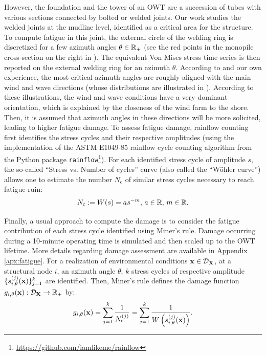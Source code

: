 However, the foundation and the tower of an OWT are a succession of tubes with various sections connected by bolted or welded joints. 
Our work studies the welded joints at the mudline level, identified as a critical area for the structure. 
To compute fatigue in this joint, the external circle of the welding ring is discretized for a few azimuth angles $\theta \in \mathbb{R}_+$ (see the red points in the monopile cross-section on the right in ). 
The equivalent Von Mises stress time series is then reported on the external welding ring for an azimuth $\theta$. 
According to \cite{li_zhan_2020} and our own experience, the most critical azimuth angles are roughly aligned with the main wind and wave directions (whose distributions are illustrated in ). 
According to these illustrations, the wind and wave conditions have a very dominant orientation, which is explained by the closeness of the wind farm to the shore. 
Then, it is assumed that azimuth angles in these directions will be more solicited, leading to higher fatigue damage. 
To assess fatigue damage, rainflow counting \citep{dowling_1972} first identifies the stress cycles and their respective amplitudes (using the implementation of the ASTM E1049-85 rainflow cycle counting algorithm from the Python package \texttt{rainflow}\footnote{\url{https://github.com/iamlikeme/rainflow}}). 
For each identified stress cycle of amplitude $s$, the so-called ``Stress vs. Number of cycles'' curve (also called the ``W\"ohler curve'') allows one to estimate the number $N_{\mathrm{c}}$ of similar stress cycles necessary to reach fatigue ruin:
\begin{equation}
    N_{\mathrm{c}} := W(s) = a s^{-m}, \, a\in\mathbb{R}, \, m\in\mathbb{R}.
    \label{eq:wohler}
\end{equation}

Finally, a usual approach to compute the damage is to consider the fatigue contribution of each stress cycle identified using Miner's rule. 
Damage occurring during a 10-minute operating time is simulated and then scaled up to the OWT lifetime. 
More details regarding damage assessment are available in Appendix \ref{apx:fatigue}. 
For a realization of environmental conditions ${\bf x} \in \mathcal{D}_{{\bf X}}$, at a structural node $i$, an azimuth angle $\theta$; $k$ stress cycles of respective amplitude $\{s_{i, \theta}^{(j)}({\bf x})\}_{j=1}^k$ are identified. 
Then, Miner's rule \citep{fatemi_1998} defines the damage function $g_{i, \theta}({\bf x}): \mathcal{D}_{{\bf X}} \rightarrow \mathbb{R}_+$ by:
\begin{equation}
    g_{i, \theta}({\bf x}) = \sum_{j=1}^{k} \frac{1}{N_{\mathrm{c}}^{(j)}} = \sum_{j=1}^{k} \frac{1}{W\left(s_{i, \theta}^{(j)}({\bf x})\right)}.
    \label{miner1}
\end{equation}

